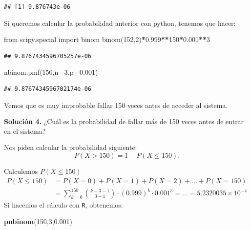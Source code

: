 \documentclass[]{book}
\newenvironment{Shaded}{\begin{snugshade}}{\end{snugshade}}
\newcommand{\DecValTok}[1]{\textcolor[rgb]{0.00,0.00,0.81}{#1}}
\newcommand{\FloatTok}[1]{\textcolor[rgb]{0.00,0.00,0.81}{#1}}
\newcommand{\ImportTok}[1]{#1}
\newcommand{\KeywordTok}[1]{\textcolor[rgb]{0.13,0.29,0.53}{\textbf{#1}}}
\newcommand{\NormalTok}[1]{#1}
\newcommand{\OperatorTok}[1]{\textcolor[rgb]{0.81,0.36,0.00}{\textbf{#1}}}
\begin{document}
\begin{verbatim}
## [1] 9.876743e-06
\end{verbatim}

Si queremos calcular la probabilidad anterior con python, tenemos que hacer:

\begin{Shaded}
\begin{Highlighting}[]
\ImportTok{from}\NormalTok{  scipy.special }\ImportTok{import}\NormalTok{ binom}
\NormalTok{binom(}\DecValTok{152}\NormalTok{,}\DecValTok{2}\NormalTok{)}\OperatorTok{*}\FloatTok{0.999}\OperatorTok{**}\DecValTok{150}\OperatorTok{*}\FloatTok{0.001}\OperatorTok{**}\DecValTok{3}
\end{Highlighting}
\end{Shaded}

\begin{verbatim}
## 9.8767434596705257e-06
\end{verbatim}

\begin{Shaded}
\begin{Highlighting}[]
\NormalTok{nbinom.pmf(}\DecValTok{150}\NormalTok{,n}\OperatorTok{=}\DecValTok{3}\NormalTok{,p}\OperatorTok{=}\FloatTok{0.001}\NormalTok{)}
\end{Highlighting}
\end{Shaded}

\begin{verbatim}
## 9.8767434596702174e-06
\end{verbatim}

Vemos que es muy improbable fallar 150 veces antes de acceder al sistema.

\textbf{Solución 4.} ¿Cuál es la probabilidad de fallar más de 150 veces antes de entrar en el sistema?

Nos piden calcular la probabilidad siguiente:
\[P(X>150)=1-P(X\leq 150).\]

Calculemos \(P(X\leq 150)\)
\[
\begin{array}{rl}
P(X\leq 150) &= P(X=0)+P(X=1)+P(X=2)+\ldots+P(X=150) \\ & = \sum\limits_{k=0}^{150} {k+3-1\choose 3-1} \cdot (0.999)^{k}\cdot 0.001^3= \ldots = \ensuremath{5.2320035\times 10^{-4}}
\end{array}
\]
Si hacemos el cálculo con \texttt{R}, obtenemos:

\begin{Shaded}
\begin{Highlighting}[]
\KeywordTok{pnbinom}\NormalTok{(}\DecValTok{150}\NormalTok{,}\DecValTok{3}\NormalTok{,}\FloatTok{0.001}\NormalTok{)}
\end{Highlighting}
\end{Shaded}
\end{document}
